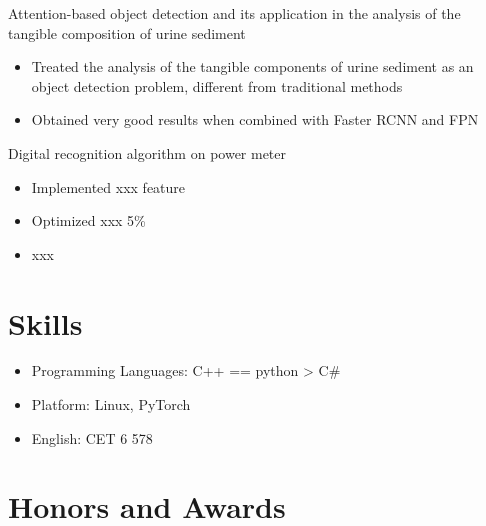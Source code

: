 \documentclass{resume}
\begin{document}
Attention-based object detection and its application in the analysis of the tangible composition of urine sediment
\begin{itemize}
  \item Treated the analysis of the tangible components of urine sediment as an object detection problem, different from traditional methods
  \item Obtained very good results when combined with Faster RCNN and FPN
\end{itemize}

Digital recognition algorithm on power meter
\begin{itemize}
  \item Implemented xxx feature
  \item Optimized xxx 5\%
  \item xxx
\end{itemize}


\section{Skills}
\begin{itemize}[parsep=0.5ex]
  \item Programming Languages: C++ == python > C\#
  \item Platform: Linux, PyTorch
  \item English: CET 6 578
\end{itemize}

\section{Honors and Awards}

%
%
\end{document}
